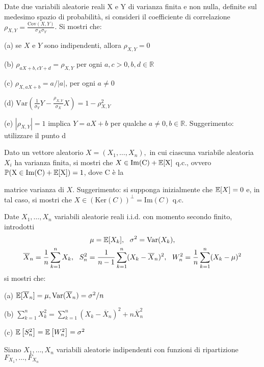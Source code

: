 
\ParteEsercizi

\Esercizio{}

Date due variabili aleatorie reali X e Y di varianza finita e non nulla, definite sul medesimo spazio di probabilità, si consideri il coefficiente di correlazione $\rho _{X,Y} =\frac{\mathrm{Cov} (X,Y)}{\sigma _{X} \sigma _{Y}}$. Si mostri che:

(a) se $X$ e $Y$ sono indipendenti, allora $\rho _{X,Y} =0$

(b) $\rho _{aX+b,cY+d} =\rho _{X,Y}$ per ogni $a,c >0,b,d\in \mathbb{R}$

(c) $\rho _{X,aX+b} =a/|a|$, per ogni $a\neq 0$

(d) $\mathrm{Var}\left(\frac{1}{\sigma _{Y}} Y-\frac{\rho _{X,Y}}{\sigma _{X}} X\right) =1-\rho _{X,Y}^{2}$

(e) $| \rho _{X,Y}| =1$ implica $Y=aX+b$ per qualche $a\neq 0,b\in \mathbb{R}$. Suggerimento: utilizzare il punto d
\Esercizio{$\star$}

Dato un vettore aleatorio $X=( X_{1} ,\dots ,X_{n}) ,$ in cui ciascuna variabile aleatoria $X_{i}$ ha varianza finita, si mostri che $X\in \mathrm{Im} (\mathrm{C} )+\mathbb{E} [\mathrm{X} ]$ q.c., ovvero $\mathbb{P} (\mathrm{X} \in \mathrm{Im} (\mathrm{C} )+\mathbb{E} [\mathrm{X} ])=1$, dove $\mathrm{C}$ è la

matrice varianza di $X$. Suggerimento: si supponga inizialmente che $\mathbb{E} [X]=0$ e, in tal caso, si mostri che $X\in (\mathrm{Ker} (C))^{\perp } =\mathrm{Im} (C)$ q.c.
\Esercizio{}

Date $X_{1} ,\dots ,X_{n}$ variabili aleatorie reali i.i.d. con momento secondo finito, introdotti
\begin{gather*}
\mu =\EE[ X_{k}] ,\ \ \sigma ^{2} =\mathrm{Var}( X_{k}) ,\\
\overline{X}_{n} =\frac{1}{n}\sum _{k=1}^{n} X_{k} ,\ \ S_{n}^{2} =\frac{1}{n-1}\sum _{k=1}^{n}( X_{k} -\overline{X}_{n})^{2} ,\ \ W_{n}^{2} =\frac{1}{n}\sum _{k=1}^{n}( X_{k} -\mu )^{2}
\end{gather*}
si mostri che:

(a) $\mathbb{E}[\overline{X}_{n}] =\mu ,\mathrm{Var}(\overline{X}_{n}) =\sigma ^{2} /n$

(b) $\sum _{k=1}^{n} X_{k}^{2} =\sum _{k=1}^{n}( X_{k} -\overline{X}_{n})^{2} +n\overline{X}_{n}^{2}$

(c) $\mathbb{E}\left[ S_{n}^{2}\right] =\mathbb{E}\left[ W_{n}^{2}\right] =\sigma ^{2}$
\Esercizio{}

Siano $X_{1} ,\dots ,X_{n}$ variabili aleatorie indipendenti con funzioni di ripartizione $F_{X_{1}} ,\dots ,F_{X_{n}}$

